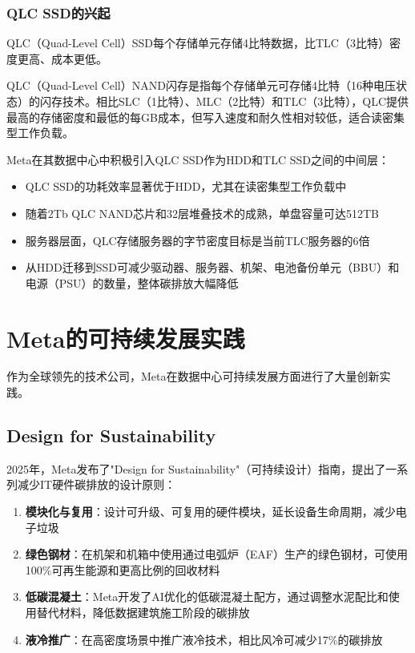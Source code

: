 \subsubsection{QLC SSD的兴起}

QLC（Quad-Level Cell）SSD每个存储单元存储4比特数据，比TLC（3比特）密度更高、成本更低。

\begin{definition}
QLC（Quad-Level Cell）NAND闪存是指每个存储单元可存储4比特（16种电压状态）的闪存技术。相比SLC（1比特）、MLC（2比特）和TLC（3比特），QLC提供最高的存储密度和最低的每GB成本，但写入速度和耐久性相对较低，适合读密集型工作负载。
\end{definition}

Meta在其数据中心中积极引入QLC SSD作为HDD和TLC SSD之间的中间层：
\begin{itemize}
    \item QLC SSD的功耗效率显著优于HDD，尤其在读密集型工作负载中
    \item 随着2Tb QLC NAND芯片和32层堆叠技术的成熟，单盘容量可达512TB
    \item 服务器层面，QLC存储服务器的字节密度目标是当前TLC服务器的6倍
    \item 从HDD迁移到SSD可减少驱动器、服务器、机架、电池备份单元（BBU）和电源（PSU）的数量，整体碳排放大幅降低
\end{itemize}

\section{Meta的可持续发展实践}\label{sec:meta-sustainability}

作为全球领先的技术公司，Meta在数据中心可持续发展方面进行了大量创新实践。

\subsection{Design for Sustainability}

2025年，Meta发布了"Design for Sustainability"（可持续设计）指南，提出了一系列减少IT硬件碳排放的设计原则：

\begin{enumerate}
    \item \textbf{模块化与复用}：设计可升级、可复用的硬件模块，延长设备生命周期，减少电子垃圾
    \item \textbf{绿色钢材}：在机架和机箱中使用通过电弧炉（EAF）生产的绿色钢材，可使用100\%可再生能源和更高比例的回收材料
    \item \textbf{低碳混凝土}：Meta开发了AI优化的低碳混凝土配方，通过调整水泥配比和使用替代材料，降低数据建筑施工阶段的碳排放
    \item \textbf{液冷推广}：在高密度场景中推广液冷技术，相比风冷可减少17\%的碳排放
\end{enumerate}

